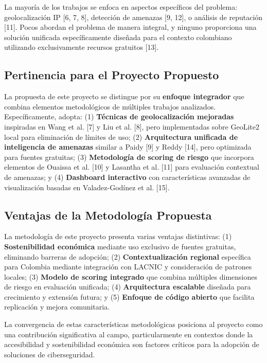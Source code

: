 La mayoría de los trabajos se enfoca en aspectos específicos del problema: geolocalización IP [6, 7, 8], detección de amenazas [9, 12], o análisis de reputación [11]. Pocos abordan el problema de manera integral, y ninguno proporciona una solución unificada específicamente diseñada para el contexto colombiano utilizando exclusivamente recursos gratuitos [13].

\subsection{Pertinencia para el Proyecto Propuesto}

La propuesta de este proyecto se distingue por su \textbf{enfoque integrador} que combina elementos metodológicos de múltiples trabajos analizados. Específicamente, adopta: (1) \textbf{Técnicas de geolocalización mejoradas} inspiradas en Wang et al. [7] y Liu et al. [8], pero implementadas sobre GeoLite2 local para eliminación de límites de uso; (2) \textbf{Arquitectura unificada de inteligencia de amenazas} similar a Paidy [9] y Reddy [14], pero optimizada para fuentes gratuitas; (3) \textbf{Metodología de scoring de riesgo} que incorpora elementos de Ouaissa et al. [10] y Lasantha et al. [11] para evaluación contextual de amenazas; y (4) \textbf{Dashboard interactivo} con características avanzadas de visualización basadas en Valadez-Godínez et al. [15].

\subsection{Ventajas de la Metodología Propuesta}

La metodología de este proyecto presenta varias ventajas distintivas: (1) \textbf{Sostenibilidad económica} mediante uso exclusivo de fuentes gratuitas, eliminando barreras de adopción; (2) \textbf{Contextualización regional} específica para Colombia mediante integración con LACNIC y consideración de patrones locales; (3) \textbf{Modelo de scoring integrado} que combina múltiples dimensiones de riesgo en evaluación unificada; (4) \textbf{Arquitectura escalable} diseñada para crecimiento y extensión futura; y (5) \textbf{Enfoque de código abierto} que facilita replicación y mejora comunitaria.

La convergencia de estas características metodológicas posiciona al proyecto como una contribución significativa al campo, particularmente en contextos donde la accesibilidad y sostenibilidad económica son factores críticos para la adopción de soluciones de ciberseguridad.
